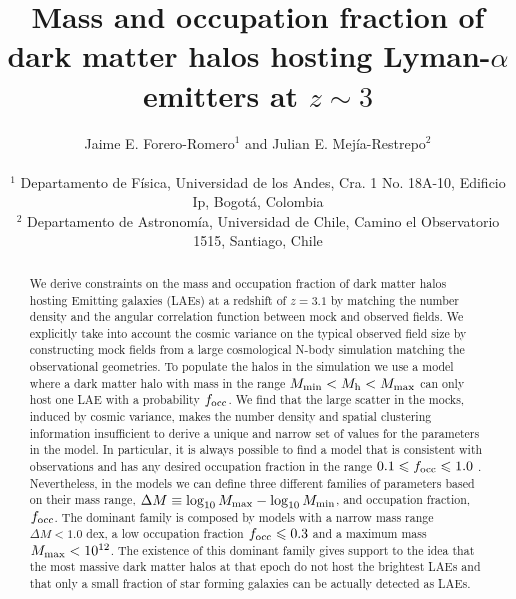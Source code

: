 \documentclass[usenatbib]{mn2e}
\newcommand{\ly}{{\ifmmode{{\rm Ly}\alpha}\else{Ly$\alpha$~}\fi}}
\newcommand{\hMsun}{{\ifmmode{h^{-1}{\rm
        {M_{\odot}}}}\else{$h^{-1}{\rm{M_{\odot}}}$}\fi}}
\begin{document}
\title[Halo mass and occupation fraction for LAEs at
  $z=3.1$]{Mass and occupation
  fraction of dark matter halos hosting Lyman-$\alpha$ emitters
  at $z\sim 3$}    
\author[~J.~E. Forero-Romero and ~J.~E Mejia-Restreo]{
\parbox[t]{\textwidth}{\raggedright 
Jaime E. Forero-Romero$^{1}$ and
Julian E. Mej\'ia-Restrepo$^{2}$ 
}
\vspace*{6pt}\\
$^{1}$ Departamento de F\'{i}sica, Universidad de los Andes, Cra. 1
No. 18A-10, Edificio Ip, Bogot\'a, Colombia \\
$^{2}$ Departamento de Astronom\'{i}a, Universidad de Chile, Camino el
Observatorio 1515, Santiago, Chile} 

\maketitle

\begin{abstract}
%
We derive constraints on the mass and occupation fraction of dark
matter halos hosting \ly Emitting galaxies (LAEs) at a redshift of
$z=3.1$ by matching the number density and the angular
correlation function between mock and observed fields. We explicitly
take into account the cosmic variance on the typical observed field size by
constructing mock fields from a large cosmological N-body
simulation matching the observational geometries. To populate the
halos in the simulation we use a model where a dark matter halo with
mass in the range $M_{\rm   min}<M_{\rm h}<M_{\rm max}$ can only host one LAE with a
probability $f_{\rm occ}$. We find that the large scatter in the mocks, induced by
cosmic variance, makes the number density and spatial clustering
information insufficient to derive a unique and narrow set of values
for the parameters in the model. In particular, it is always possible
to find a model that is consistent with observations and has any
desired occupation fraction in the range $0.1\leq f_{\rm occ}\leq 1.0$
.  Nevertheless, in the models we can define three different families
of parameters based on their mass range, $\Delta M \equiv
\log_{10}M_{\rm max} - \log_{10} M_{\rm min}$, and occupation fraction,
$f_{\rm occ}$. The dominant family is composed by models with a narrow
mass range $\Delta M<1.0$ dex, a low occupation fraction $f_{\rm
  occ}\leq 0.3$ and a maximum mass $M_{\rm  max}< 10^{12}$\hMsun.  The
existence of this dominant family gives support to the idea that the
most massive dark matter halos at that epoch do not host the brightest
LAEs and that only a small fraction of star forming galaxies can be
actually detected as LAEs.
\end{abstract}
\end{document}
